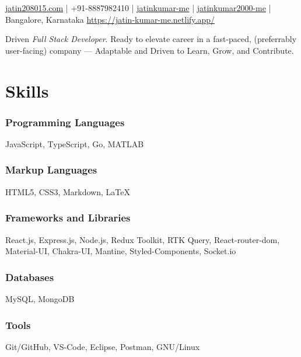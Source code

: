 \documentclass[a4paper]{article}
\author{Jatin Kumar}
\begin{document}
\begin{center}
	\makeatletter
	\centering {\huge \@author}
	\makeatother
	\vspace{6pt}

	\href{mailto:jatin208015\@gmail.com}{{\faAt} jatin208015\@gmail.com} |
	{\faPhone } +91-8887982410 |
	\href{https://github.com/jatinkumar-me}{{\faGithub} jatinkumar-me} |
	\href{https://www.linkedin.com/in/jatinkumar-2000-me/}{{\faLinkedin} {jatinkumar2000-me}} |
	{\faMapMarker} Bangalore, Karnataka
	\href{https://jatin-kumar-me.netlify.app/}{{\faGlobe} https://jatin-kumar-me.netlify.app/}
\end{center}

\vspace{-10pt}
\hrulefill
\vspace{-5pt}

\begin{center}
Driven \textit{Full Stack Developer}. Ready to elevate career in a fast-paced, (preferrably user-facing) company — Adaptable and Driven to Learn, Grow, and Contribute.
\end{center}

\section{Skills}
\subsubsection*{Programming Languages}
JavaScript, TypeScript, Go, MATLAB
\vspace{-10pt}
\subsubsection*{Markup Languages}
HTML5, CSS3, Markdown, \LaTeX
\vspace{-10pt}
\subsubsection*{Frameworks and Libraries}
React.js, Express.js, Node.js, Redux Toolkit, RTK Query, React-router-dom, Material-UI, Chakra-UI, Mantine, Styled-Components, Socket.io
\vspace{-10pt}
\subsubsection*{Databases}
MySQL, MongoDB
\vspace{-10pt}
\subsubsection*{Tools}
Git/GitHub, VS-Code, Eclipse, Postman, GNU/Linux
\end{document}
